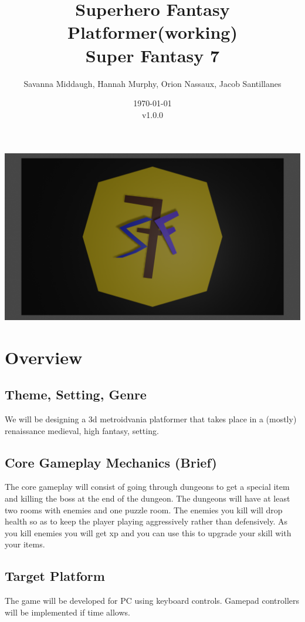 \documentclass[titlepage]{article}
\title{Superhero Fantasy Platformer(working)\\
	\large Super Fantasy 7}
\author{Savanna Middaugh, Hannah Murphy, Orion Nassaux, Jacob Santillanes}
\date{\today\\v1.0.0}
\begin{document}
\maketitle
\includegraphics[scale=.15]{./images/logo.png}
\section{Overview}

\subsection*{Theme, Setting, Genre}
We will be designing a 3d metroidvania platformer that takes place in a (mostly) renaissance medieval, high fantasy, setting. 

\subsection*{Core Gameplay Mechanics (Brief)}
The core gameplay will consist of going through dungeons to get a special item and killing the boss at the end of the dungeon. The dungeons will have at least two rooms with enemies and one puzzle room. The enemies you kill will drop health so as to keep the player playing aggressively rather than defensively. As you kill enemies you will get xp and you can use this to upgrade your skill with your items. 

\subsection*{Target Platform}
The game will be developed for PC using keyboard controls. Gamepad controllers will be implemented if time allows.
\end{document}

